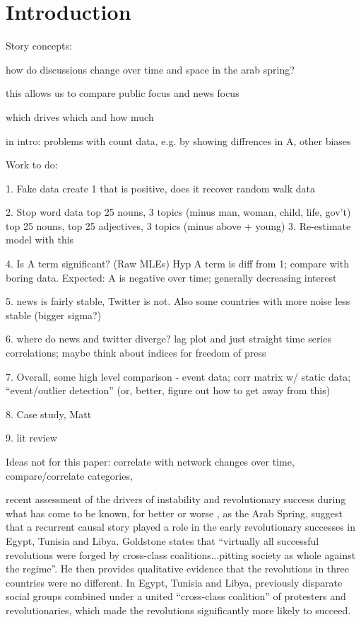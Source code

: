 \section{Introduction}

Story concepts:

how do discussions change over time and space in the arab spring?

this allows us to compare public focus and news focus

which drives which and how much

in intro: problems with count data, e.g. by showing diffrences in A, other biases

Work to do:

1. Fake data
	create 1 that is positive, does it recover
	random walk data

2. Stop word data
	top 25 nouns, 3 topics (minus man, woman, child, life, gov't)
	top 25 nouns, top 25 adjectives, 3 topics (minus above + young)
3. Re-estimate model with this	

4. Is A term significant? (Raw MLEs) Hyp A term is diff from 1; compare with boring data. Expected: A is negative over time; generally decreasing interest

5. news is fairly stable, Twitter is not. Also some countries with more noise less stable (bigger sigma?)

6. where do news and twitter diverge?  lag plot and just straight time series correlations; maybe think about indices for freedom of press

7. Overall, some high level comparison - event data; corr matrix w/ static data; ``event/outlier  detection'' (or, better, figure out how to get away from this)

8. Case study, Matt

9. lit review

Ideas not for this paper:
	correlate with network changes over time, compare/correlate categories, 


 recent assessment of the drivers of instability and revolutionary success during what has come to be known, for better or worse \cite{gelvin_arab_2015}, as the Arab Spring, suggest that a recurrent causal story played a role in the early revolutionary successes in Egypt, Tunisia and Libya.  Goldstone states that ``virtually all successful revolutions were forged by cross-class coalitions...pitting society as whole against the regime''. He then provides qualitative evidence that the revolutions in three countries were no different.  In Egypt, Tunisia and Libya, previously disparate social groups combined under a united ``cross-class coalition'' of protesters and revolutionaries, which made the revolutions significantly more likely to succeed.

